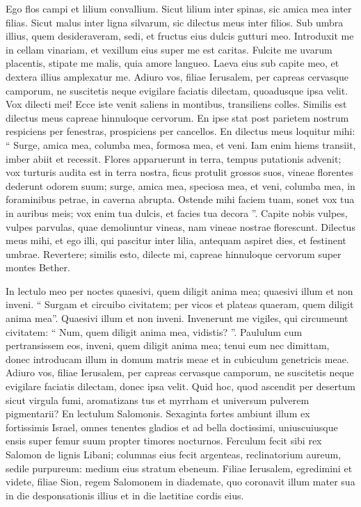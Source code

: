 \begin{biblechapter}
\begin{biblechapter}
\verse Ego flos campi
 et lilium convallium.
 \verse Sicut lilium inter spinas,
 sic amica mea inter filias.
 \verse Sicut malus inter ligna silvarum,
 sic dilectus meus inter filios.
 Sub umbra illius, quem desideraveram, sedi,
 et fructus eius dulcis gutturi meo.
 \verse Introduxit me in cellam vinariam,
 et vexillum eius super me est caritas.
 \verse Fulcite me uvarum placentis,
 stipate me malis,
 quia amore langueo.
 \verse Laeva eius sub capite meo,
 et dextera illius amplexatur me.
 \verse Adiuro vos, filiae Ierusalem,
 per capreas cervasque camporum,
 ne suscitetis neque evigilare faciatis dilectam,
 quoadusque ipsa velit.
 \verse Vox dilecti mei!
 Ecce iste venit
 saliens in montibus,
 transiliens colles.
 \verse Similis est dilectus meus capreae
 hinnuloque cervorum.
 En ipse stat
 post parietem nostrum
 respiciens per fenestras,
 prospiciens per cancellos.
 \verse En dilectus meus loquitur mihi:
 “ Surge, amica mea,
 columba mea, formosa mea, et veni.
 \verse Iam enim hiems transiit,
 imber abiit et recessit.
 \verse Flores apparuerunt in terra,
 tempus putationis advenit;
 vox turturis audita est
 in terra nostra,
 \verse ficus protulit grossos suos,
 vineae florentes dederunt odorem suum;
 surge, amica mea,
 speciosa mea, et veni,
 \verse columba mea, in foraminibus petrae,
 in caverna abrupta.
 Ostende mihi faciem tuam,
 sonet vox tua in auribus meis;
 vox enim tua dulcis,
 et facies tua decora ”.
 \verse Capite nobis vulpes, vulpes parvulas,
 quae demoliuntur vineas,
 nam vineae nostrae florescunt.
 \verse Dilectus meus mihi, et ego illi,
 qui pascitur inter lilia,
 \verse antequam aspiret dies,
 et festinent umbrae.
 Revertere; similis esto,
 dilecte mi, capreae
 hinnuloque cervorum super montes Bether.
 
\begin{biblechapter}
\verse In lectulo meo per noctes
 quaesivi, quem diligit anima mea;
 quaesivi illum et non inveni.
 \verse “ Surgam et circuibo civitatem;
 per vicos et plateas
 quaeram, quem diligit anima mea”.
 Quaesivi illum et non inveni.
 \verse Invenerunt me vigiles,
 qui circumeunt civitatem:
 “ Num, quem diligit anima mea, vidistis? ”.
 \verse Paululum cum pertransissem eos,
 inveni, quem diligit anima mea;
 tenui eum nec dimittam,
 donec introducam illum in domum matris meae
 et in cubiculum genetricis meae.
 \verse Adiuro vos, filiae Ierusalem,
 per capreas cervasque camporum,
 ne suscitetis neque evigilare faciatis dilectam,
 donec ipsa velit.
 \verse Quid hoc, quod ascendit per desertum
 sicut virgula fumi,
 aromatizans tus et myrrham
 et universum pulverem pigmentarii?
 \verse En lectulum Salomonis.
 Sexaginta fortes ambiunt illum
 ex fortissimis Israel,
 \verse omnes tenentes gladios
 et ad bella doctissimi,
 uniuscuiusque ensis super femur suum
 propter timores nocturnos.
 \verse Ferculum fecit sibi rex Salomon
 de lignis Libani;
 \verse columnas eius fecit argenteas,
 reclinatorium aureum,
 sedile purpureum:
 medium eius stratum ebeneum.
 Filiae Ierusalem,
 \verse egredimini et videte,
 filiae Sion,
 regem Salomonem
 in diademate, quo coronavit illum mater sua
 in die desponsationis illius
 et in die laetitiae cordis eius.
 

\end{biblechapter}
\end{biblechapter}
\end{biblechapter}

